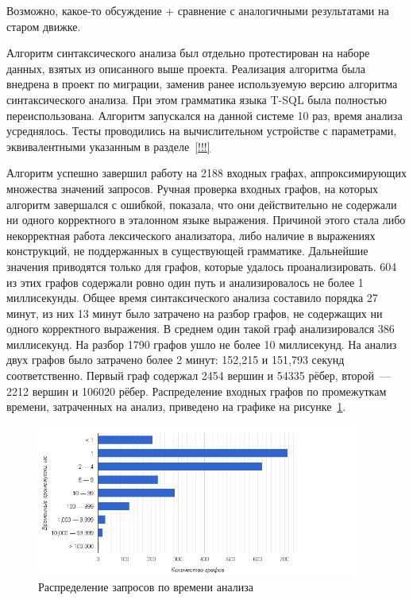 Возможно, какое-то обсуждение + сравнение с аналогичными результатами на старом движке.

Алгоритм синтаксического анализа был отдельно протестирован на наборе данных, взятых из описанного выше проекта. Реализация алгоритма была внедрена в проект по миграции, заменив ранее используемую версию алгоритма синтаксического анализа. При этом грамматика языка T-SQL была полностью переиспользована. Алгоритм запускался на данной системе 10 раз, время анализа усреднялось. Тесты проводились на вычислительном устройстве с параметрами, эквивалентными указанным в разделе~\ref{!!!}

Алгоритм успешно завершил работу на 2188 входных графах, аппроксимирующих множества значений запросов. Ручная проверка входных графов, на которых алгоритм завершался с ошибкой, показала, что они действительно не содержали ни одного корректного в эталонном языке выражения. Причиной этого стала либо некорректная работа лексического анализатора, либо наличие в выражениях конструкций, не поддержанных в существующей грамматике. Дальнейшие значения приводятся только для графов, которые удалось проанализировать. 604 из этих графов содержали ровно один путь и анализировалось не более 1 миллисекунды. Общее время синтаксического анализа составило порядка 27 минут, из них 13 минут было затрачено на разбор графов, не содержащих ни одного корректного выражения. В среднем один такой граф анализировался 386 миллисекунд. На разбор 1790 графов ушло не более 10 миллисекунд. На анализ двух графов было затрачено более 2 минут: 152,215 и 151,793 секунд соответственно. Первый граф содержал 2454 вершин и 54335 рёбер, второй~--- 2212 вершин и 106020 рёбер. Распределение входных графов по промежуткам времени, затраченных на анализ, приведено на графике на рисунке~\ref{distr}.

\begin{figure}[H]
  \centering
 \includegraphics[width=0.95\textwidth]{pics/distr.png}
 \caption{Распределение запросов по времени анализа}
 \label{distr}
\end{figure}

